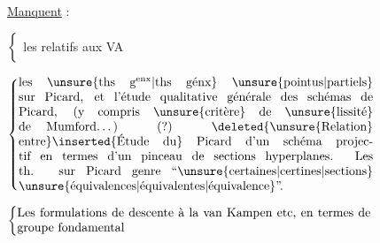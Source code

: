 \uline{Manquent} :

\reversemarginpar{}
$\left\{\vphantom{\begin{matrix}a\\a\end{matrix}}\right.$ les  relatifs aux VA

\noindent$\left\{\begin{minipage}{.83\linewidth}les \unsure{ths g\textsuperscript{enx}|ths génx} \unsure{pointus|partiels} sur Picard, et l'étude qualitative générale des schémas de Picard, (y compris \unsure{critère} de \unsure{lissité} de Mumford\ldots)

(?) \deleted{\unsure{Relation} entre}\inserted{Étude du} Picard d'un schéma projectif en termes d'un pinceau de sections hyperplanes.

Les th. sur Picard genre ``\unsure{certaines|certines|sections} \unsure{équivalences|équivalentes|équivalence}''.\end{minipage}\right.$

\noindent$\left\{\begin{minipage}{.83\linewidth}Les formulations de descente à la van Kampen etc, en termes de groupe fondamental\end{minipage}\right.$
\normalmarginpar
\clearpage
{}

